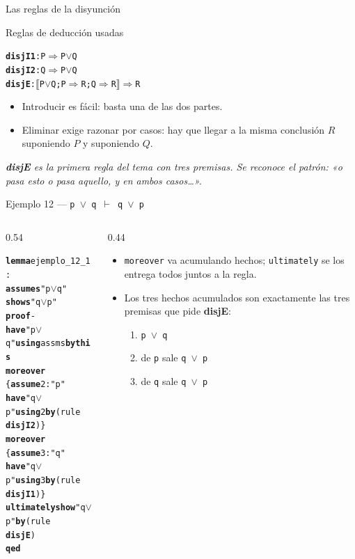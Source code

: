 \documentclass[11pt,aspectratio=169]{beamer}
\newcommand{\sOr}{\(\vee\)}
\newcommand{\sMeta}{\(\Longrightarrow\)}
\newcommand{\sTurn}{\(\vdash\)}
\newcommand{\sLb}{\(\llbracket\)}
\newcommand{\sRb}{\(\rrbracket\)}
\newcommand{\kw}[1]{\textcolor{isaCmd}{\textbf{#1}}}
\newcommand{\str}[1]{\textcolor{isaStr}{#1}}
\newcommand{\Rn}[1]{\textcolor{granate}{\textbf{#1}}}
\newcommand{\R}[1]{{\setlength{\fboxsep}{1pt}%
  \colorbox{resalte}{\ttfamily\bfseries\textcolor{granate}{#1}}}}
\newcommand{\nota}[1]{{\small\itshape\color{gray} #1}}
\begin{document}
\begin{frame}[fragile]{Las reglas de la disyunción}
  \begin{block}{Reglas de deducción usadas}
\begin{alltt}\footnotesize
\Rn{disjI1}: P \sMeta{} P \sOr{} Q
\Rn{disjI2}: Q \sMeta{} P \sOr{} Q
\Rn{disjE}:  \sLb{}P \sOr{} Q; P \sMeta{} R; Q \sMeta{} R\sRb{} \sMeta{} R
\end{alltt}
\end{block}
  
  \begin{itemize}
    \item Introducir es fácil: basta una de las dos partes.
    
    \item \alert{Eliminar exige razonar por casos}: hay que llegar a la
      misma conclusión $R$ suponiendo $P$ y suponiendo $Q$.
  \end{itemize}
  \vfill
  
  \nota{\Rn{disjE} es la primera regla del tema con tres premisas. Se
  reconoce el patrón: «o pasa esto o pasa aquello, y en ambos casos\ldots».}
\end{frame}

\begin{frame}[fragile]{Ejemplo 12 --- \texttt{p \sOr{} q \sTurn{} q \sOr{} p}}
  \begin{columns}[T]
    \begin{column}{0.54\textwidth}
\begin{alltt}\footnotesize
\kw{lemma} ejemplo_12_1:
  \kw{assumes} \str{"p \sOr{} q"}
  \kw{shows} \str{"q \sOr{} p"}
\kw{proof} -
  \kw{have} \str{"p \sOr{} q"} \kw{using} assms \kw{by} \kw{this}
  \kw{moreover}
  \{ \kw{assume} 2: \str{"p"}
    \kw{have} \str{"q \sOr{} p"} \kw{using} 2 \kw{by} (rule \R{disjI2}) \}
  \kw{moreover}
  \{ \kw{assume} 3: \str{"q"}
    \kw{have} \str{"q \sOr{} p"} \kw{using} 3 \kw{by} (rule \R{disjI1}) \}
  \kw{ultimately} \kw{show} \str{"q \sOr{} p"} \kw{by} (rule \R{disjE})
\kw{qed}
\end{alltt}
    \end{column}
    \begin{column}{0.44\textwidth}
      \footnotesize
      \begin{itemize}
        \item<2-> \texttt{moreover} va \alert{acumulando} hechos;
          \texttt{ultimately} se los entrega todos juntos a la regla.
        \item<3-> Los tres hechos acumulados son exactamente las tres
          premisas que pide \Rn{disjE}:
          \begin{enumerate}
            \item<4-> \texttt{p \sOr{} q}
            \item<4-> de \texttt{p} sale \texttt{q \sOr{} p}
            \item<4-> de \texttt{q} sale \texttt{q \sOr{} p}
          \end{enumerate}
      \end{itemize}
    \end{column}
  \end{columns}
\end{frame}
\end{document}
